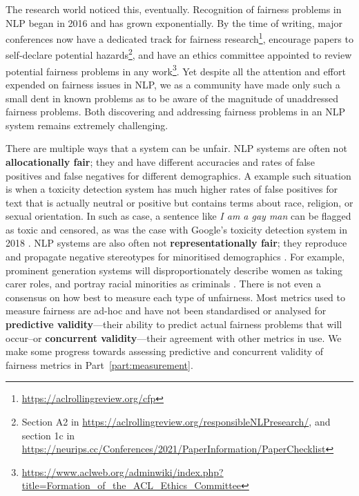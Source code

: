 The research world noticed this, eventually. Recognition of fairness problems in NLP began in 2016 and has grown exponentially. By the time of writing, major conferences now have a dedicated track for fairness research\footnote{\url{https://aclrollingreview.org/cfp}}, encourage papers to self-declare potential hazards\footnote{Section A2 in \url{https://aclrollingreview.org/responsibleNLPresearch/}, and section 1c in \url{https://neurips.cc/Conferences/2021/PaperInformation/PaperChecklist}}, and have an ethics committee appointed to review potential fairness problems in any work\footnote{\url{https://www.aclweb.org/adminwiki/index.php?title=Formation_of_the_ACL_Ethics_Committee}}. Yet despite all the attention and effort expended on fairness issues in NLP, we as a community have made only such a small dent in known problems as to be aware of the magnitude of unaddressed fairness problems. Both discovering and addressing fairness problems in an NLP system remains extremely challenging. 

There are multiple ways that a system can be unfair. NLP systems are often not \textbf{allocationally fair}; they and have different accuracies and rates of false positives and false negatives for different demographics. A example such situation is when a toxicity detection system has much higher rates of false positives for text that is actually neutral or positive but contains terms about race, religion, or sexual orientation. In such as case, a sentence like \textit{ I am a gay man} can be flagged as toxic and censored, as was the case with Google's toxicity detection system in 2018 \citep{Dixon2018MeasuringAM}. NLP systems are also often not \textbf{representationally fair}; they reproduce and propagate negative stereotypes for minoritised demographics \citep{crawford_keynote}. For example, prominent generation systems will disproportionately describe women as taking carer roles, and portray racial minorities as criminals \citep{sheng-etal-2019-woman}. There is not even a consensus on how best to measure each type of unfairness. Most metrics used to measure fairness are ad-hoc and have not been standardised or analysed for \textbf{predictive validity}---their ability to predict actual fairness problems that will occur--or \textbf{concurrent validity}---their agreement with other metrics in use. We make some progress towards assessing predictive and concurrent validity of fairness metrics in Part~\ref{part:measurement}.  

